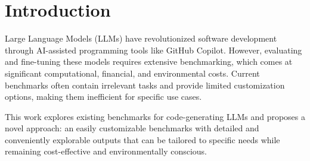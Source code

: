 
%
%

\chapter{Introduction}


Large Language Models (LLMs) have revolutionized software development through AI-assisted programming tools like GitHub Copilot. However, evaluating and fine-tuning these models requires extensive benchmarking, which comes at significant computational, financial, and environmental costs. Current benchmarks often contain irrelevant tasks and provide limited customization options, making them inefficient for specific use cases.

This work explores existing benchmarks for code-generating LLMs and proposes a novel approach: an easily customizable benchmarks with detailed and conveniently explorable outputs that can be tailored to specific needs while remaining cost-effective and environmentally conscious.

